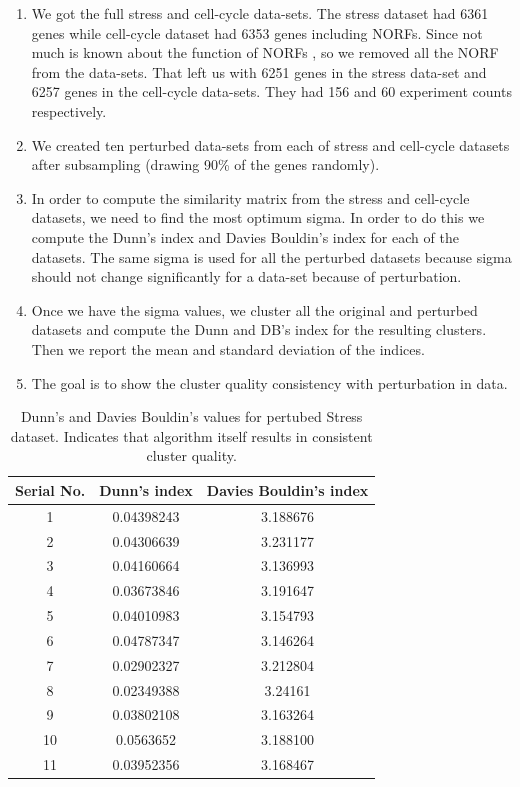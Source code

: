 \begin{enumerate}
  
\item We got the full stress and cell-cycle data-sets. The stress dataset had 6361 genes while cell-cycle dataset had 6353 genes including NORFs. Since not much is known about the function of NORFs , so we removed all the NORF from the data-sets. 
That left us with 6251 genes in the stress data-set and 6257 genes in the cell-cycle data-sets. They had 156 and 60 experiment counts respectively.
 
\item We created ten perturbed data-sets from each of stress and cell-cycle datasets after subsampling (drawing 90\% of the genes randomly).

\item In order to compute the similarity matrix from the stress and cell-cycle datasets, we need to find the most optimum sigma. In order to do this we compute the Dunn’s index and Davies Bouldin’s index for each of the datasets. The same sigma is used for all the perturbed datasets because sigma should not change significantly for a data-set because of perturbation.

\item Once we have the sigma values, we cluster all the original and perturbed datasets and  compute the Dunn and DB’s index for the resulting clusters. 
Then we report the mean and standard deviation of the indices. 

\item The goal is to show the cluster quality consistency with perturbation in data. 
\end{enumerate}

\begin{table}
\centering
\begin{tabular}{|c|c|c|}
\hline
Serial No. & Dunn’s index  & Davies Bouldin’s index\\
\hline 
1 & 0.04398243 & 3.188676 \\
2 & 0.04306639 & 3.231177 \\
3 & 	0.04160664 & 3.136993 \\
4 & 	0.03673846 & 3.191647 \\
5 & 	0.04010983 & 3.154793 \\
6 & 	0.04787347 & 3.146264 \\
7 & 	0.02902327 & 3.212804 \\
8 & 	0.02349388 & 3.24161 \\
9 & 	0.03802108 & 3.163264 \\
10 & 	0.0563652 & 3.188100 \\
11 & 	0.03952356 & 3.168467 \\
\hline 
\end{tabular}
\caption{Dunn's and Davies Bouldin's values for pertubed Stress dataset. Indicates that algorithm itself results in consistent cluster quality.}
\label{tab:stress_only_perturb}
\end{table}

